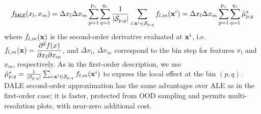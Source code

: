 \begin{equation}
  f_{\mathtt{DALE}}(x_l, x_m)
  = \Delta x_l \Delta x_m \sum_{p=1}^{p_x} \sum_{q=1}^{q_x}
  \frac{1}{|\mathcal{S}_{p,q}|} \sum_{i:\mathbf{x}^i \in \mathcal{S}_{p,q}}f_{l,m}(\mathbf{x}^i)
  = \Delta x_l \Delta x_m \sum_{p=1}^{p_x} \sum_{q=1}^{q_x} \hat{\mu}_{p,q}^s
  \label{eq:DALE-2}
\end{equation}
%
where \( f_{l,m}(\mathbf{x}) \) is the second-order derivative evaluated at
\(\mathbf{x}^i\), i.e.
\( f_{l,m}(\mathbf{x}) = \dfrac{\partial^2f(x)}{\partial x_l \partial x_m}
\), and \(\Delta x_l\), \(\Delta x_m\) correspond to the bin step for
features \(x_l\) and \(x_m\), respectively. As in the first-order
description, we use
\( \hat{\mu}_{p,q}^s = \frac{1}{|\mathcal{S}_{p,q}|} \sum_{i:\mathbf{x}^i \in
  \mathcal{S}_{p,q}}f_{l,m}(\mathbf{x}^i)\) to express the local effect at
the bin \( (p, q) \). DALE second-order approximation has the same
advantages over ALE as in the first-order case; it is faster,
protected from OOD sampling and permits multi-resolution plots, with
near-zero additional cost.
